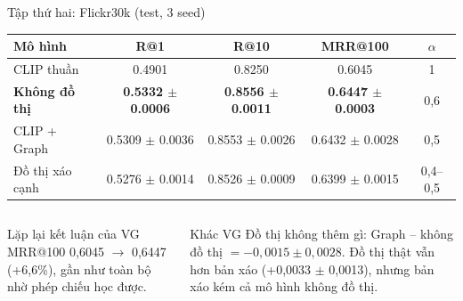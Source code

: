 \documentclass[10pt, aspectratio=169]{beamer}
\makeatletter
\newcommand{\mrr}{MRR@100}
\newcommand{\pmm}{\ensuremath{\pm}}
\makeatother
\begin{document}
\begin{frame}{Tập thứ hai: Flickr30k (test, 3 seed)}
  \centering\small
  \begin{tabular}{l c c c c}
    \toprule
    \textbf{Mô hình} & \textbf{R@1} & \textbf{R@10} & \textbf{\mrr} & $\alpha$ \\
    \midrule
    CLIP thuần & 0.4901 & 0.8250 & 0.6045 & 1 \\
    \textbf{Không đồ thị} & \textbf{0.5332 \pmm{} 0.0006} & \textbf{0.8556 \pmm{} 0.0011} & \textbf{0.6447 \pmm{} 0.0003} & 0,6 \\
    CLIP + Graph & 0.5309 \pmm{} 0.0036 & 0.8553 \pmm{} 0.0026 & 0.6432 \pmm{} 0.0028 & 0,5 \\
    Đồ thị xáo cạnh & 0.5276 \pmm{} 0.0014 & 0.8526 \pmm{} 0.0009 & 0.6399 \pmm{} 0.0015 & 0,4--0,5 \\
    \bottomrule
  \end{tabular}
  \par{}
  \vfill
  \begin{columns}[T]
      \begin{block}{Lặp lại kết luận của VG}
        \mrr{} 0,6045 $\to$ 0,6447 (+6,6\%), gần như toàn bộ nhờ phép chiếu học được.
      \end{block}
      \begin{alertblock}{Khác VG}
        Đồ thị không thêm gì: Graph -- không đồ thị $= -0{,}0015 \pmm{} 0{,}0028$. Đồ thị thật vẫn hơn bản xáo (+0,0033 \pmm{} 0,0013), nhưng bản xáo kém cả mô hình không đồ thị.
      \end{alertblock}
  \end{columns}
\end{frame}
\end{document}
